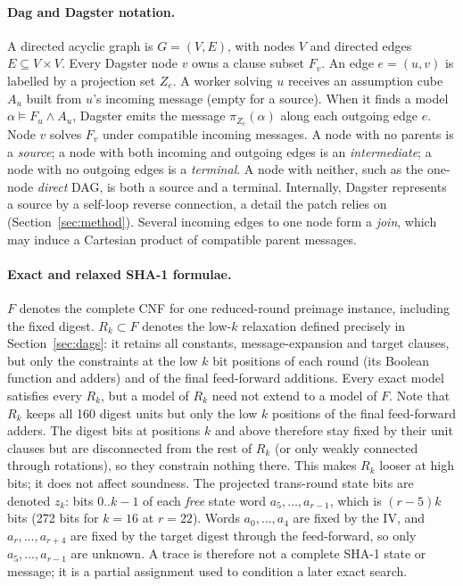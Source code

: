 \documentclass[11pt,a4paper]{article}
\begin{document}
\paragraph{Dag and Dagster notation.}
A directed acyclic graph is $G=(V,E)$, with nodes $V$ and directed edges $E\subseteq V\times V$.
Every Dagster node $v$ owns a clause subset $F_v$. An edge $e=(u,v)$ is labelled by a projection set
$Z_e$. A worker solving $u$ receives an assumption cube $A_u$ built from $u$'s incoming message
(empty for a source). When it finds a model $\alpha\models F_u\land A_u$, Dagster emits the message
$\pi_{Z_e}(\alpha)$ along each outgoing edge $e$. Node $v$ solves $F_v$ under compatible incoming
messages. A node with no parents is a \emph{source}; a node with both incoming and outgoing edges is
an \emph{intermediate}; a node with no outgoing edges is a \emph{terminal}. A node with neither, such
as the one-node \emph{direct} DAG, is both a source and a terminal. Internally, Dagster represents a
source by a self-loop reverse connection, a detail the patch relies on
(Section~\ref{sec:method}). Several incoming edges to one node form a \emph{join},
which may induce a Cartesian product of compatible parent messages.

\paragraph{Exact and relaxed SHA-1 formulae.}
$F$ denotes the complete CNF for one reduced-round preimage instance, including the fixed digest.
$R_k\subset F$ denotes the low-$k$ relaxation defined precisely in
Section~\ref{sec:dags}: it retains all constants, message-expansion and target clauses, but only the
constraints at the low $k$ bit positions of each round (its Boolean function and adders) and of the
final feed-forward additions. Every exact model satisfies every
$R_k$, but a model of $R_k$ need not extend to a model of $F$. Note that $R_k$ keeps all 160 digest
units but only the low $k$ positions of the final feed-forward adders. The digest bits at positions
$k$ and above therefore stay fixed by their unit clauses but are disconnected from the rest of
$R_k$ (or only weakly connected through rotations), so they constrain nothing there. This makes
$R_k$ looser at high bits; it does not affect soundness. The projected trans-round state bits
are denoted $z_k$: bits $0..k-1$ of each \emph{free} state word $a_5,\dots,a_{r-1}$, which is
$(r-5)k$ bits (272 bits for $k=16$ at $r=22$). Words $a_0,\dots,a_4$ are fixed by the IV, and
$a_r,\dots,a_{r+4}$ are fixed by the target digest through the feed-forward, so only
$a_5,\dots,a_{r-1}$ are unknown. A trace is therefore not a complete SHA-1 state or message; it is a partial
assignment used to condition a later exact search.
\end{document}
